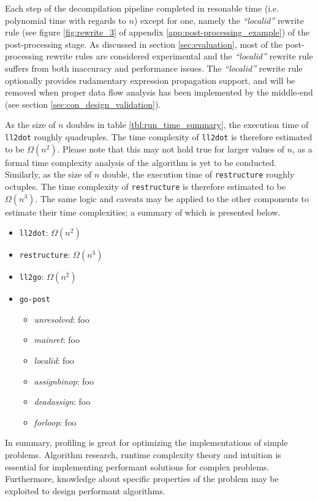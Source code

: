 Each step of the decompilation pipeline completed in resonable time (i.e. polynomial time with regards to $ n $) except for one, namely the \textit{``localid''} rewrite rule (see figure \ref{fig:rewrite_3} of appendix \ref{app:post-processing_example}) of the post-processing stage. As discussed in section \ref{sec:evaluation}, most of the post-processing rewrite rules are considered experimental and the \textit{``localid''} rewrite rule suffers from both inaccuracy and performance issues. The \textit{``localid''} rewrite rule optionally provides rudamentary expression propagation support, and will be removed when proper data flow analysis has been implemented by the middle-end (see section \ref{sec:con_design_validation}).

As the size of $ n $ doubles in table \ref{tbl:run_time_summary}, the execution time of \texttt{ll2dot} roughly quadruples. The time complexity of \texttt{ll2dot} is therefore estimated to be $ \Omega(n^{2}) $. Please note that this may not hold true for larger values of $ n $, as a formal time complexity analysis of the algorithm is yet to be conducted. Similarly, as the size of $ n $ double, the execution time of \texttt{restructure} roughly octuples. The time complexity of \texttt{restructure} is therefore estimated to be $ \Omega(n^{3}) $. The same logic and caveats may be applied to the other components to estimate their time complexities; a summary of which is presented below.


\begin{itemize}
	\item \texttt{ll2dot}: $ \Omega(n^{2}) $
	\item \texttt{restructure}: $ \Omega(n^{3}) $
	\item \texttt{ll2go}: $ \Omega(n^{2}) $
	\item \texttt{go-post}
	\begin{itemize}
		\item \textit{unresolved}: foo
		\item \textit{mainret}: foo
		\item \textit{localid}: foo
		\item \textit{assignbinop}: foo
		\item \textit{deadassign}: foo
		\item \textit{forloop}: foo
	\end{itemize}
\end{itemize}

In summary, profiling is great for optimizing the implementations of simple problems. Algorithm research, runtime complexity theory and intuition is essential for implementing performant solutions for complex problems. Furthermore, knowledge about specific properties of the problem may be exploited to design performant algorithms.




